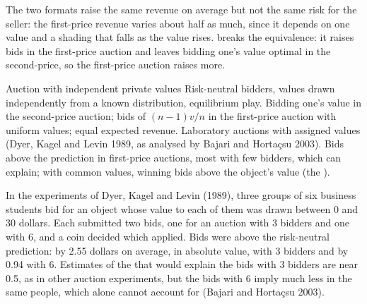 \label{lst:b2:bayesian-games:auctions}

\label{out:b2:bayesian-games:auctions}

The two formats raise the same revenue on average but not the same risk for the seller: the first-price revenue
varies about half as much, since it depends on one value and a shading that falls as the value rises. 
breaks the equivalence: it raises bids in the first-price auction and leaves bidding one's value optimal in the
second-price, so the first-price auction raises more.

\begin{model}{Auction with independent private values}
\assumes Risk-neutral bidders, values drawn independently from a known distribution, equilibrium play.
\predicts Bidding one's value in the second-price auction; bids of $(n - 1)v/n$ in the first-price auction with uniform
values; equal expected revenue.
\tested Laboratory auctions with assigned values (Dyer, Kagel and Levin 1989, as analysed by Bajari and Horta\c{c}su
2003).
\breaks Bids above the prediction in first-price auctions, most with few bidders, which  can explain;
with common values, winning bids above the object's value (the ).
\end{model}

\begin{record}
In the experiments of Dyer, Kagel and Levin (1989), three groups of six business students bid for an object whose
value to each of them was drawn between 0 and 30 dollars. Each submitted two bids, one for an auction with 3 bidders and
one with 6, and a coin decided which applied. Bids were above the risk-neutral prediction: by 2.55 dollars on average,
in absolute value, with 3 bidders and by 0.94 with 6. Estimates of the  that would explain the bids with 3
bidders are near 0.5, as in other auction experiments, but the bids with 6 imply much less  in the same
people, which  alone cannot account for (Bajari and Horta\c{c}su 2003).
\end{record}

